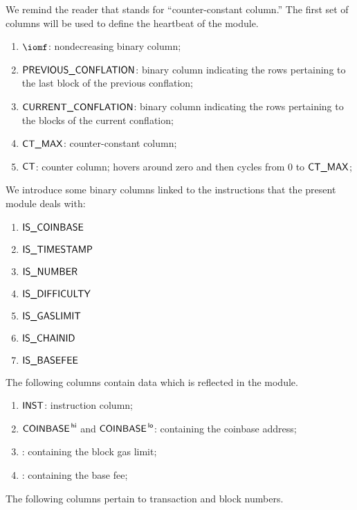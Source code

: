 We remind the reader that \ccc{} stands for ``counter-constant column.''
The first set of columns will be used to define the heartbeat of the \btcMod{} module.
\begin{enumerate}
	\item $\iomf$:
		nondecreasing binary column;
	\item $\textsf{PREVIOUS\_CONFLATION}$:
		binary column indicating the rows pertaining to the last block of the previous conflation;
	\item $\textsf{CURRENT\_CONFLATION}$:
		binary column indicating the rows pertaining to the blocks of the current conflation;
	\item $\textsf{CT\_MAX}$:
		counter-constant column;
	\item $\textsf{CT}$:
		counter column; hovers around zero and then cycles from $0$ to $\textsf{CT\_MAX}$;
\end{enumerate}
We introduce some binary columns linked to the instructions that the present module deals with:
\begin{multicols}{3}
	\begin{enumerate}[resume]
		\item $\textsf{IS\_COINBASE}$    
		\item $\textsf{IS\_TIMESTAMP}$   
		\item $\textsf{IS\_NUMBER}$      
		\item $\textsf{IS\_DIFFICULTY}$  
		\item $\textsf{IS\_GASLIMIT}$    
		\item $\textsf{IS\_CHAINID}$     
		\item $\textsf{IS\_BASEFEE}$     
	\end{enumerate} 
\end{multicols}
\noindent The following columns contain data which is reflected in the \txnDataMod{} module.
\begin{enumerate}[resume, start=13]
	\item $\textsf{INST}$:
		instruction column;
	\item $\textsf{COINBASE}^{\mathsf{\,hi}}$ and $\textsf{COINBASE}^{\mathsf{\,lo}}$:
		\ccc{} containing the
		coinbase address;
	\item \blockGasLimit{}:
		\ccc{} containing the
		block gas limit;
	\item \basefee{}:
		\ccc{} containing the
		base fee;
\end{enumerate}
The following columns pertain to transaction and block numbers.
